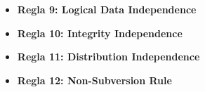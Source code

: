 \documentclass{article}
\begin{document}
\begin{itemize}
    	\item\textbf{Regla 9: Logical Data Independence}\\
    	
    	\item\textbf{Regla 10: Integrity Independence}\\
    	
    	\item\textbf{Regla 11: Distribution Independence}\\
    	
    	\item\textbf{Regla 12: Non-Subversion Rule}\\
    	
    	
    \end{itemize}
\end{document}
